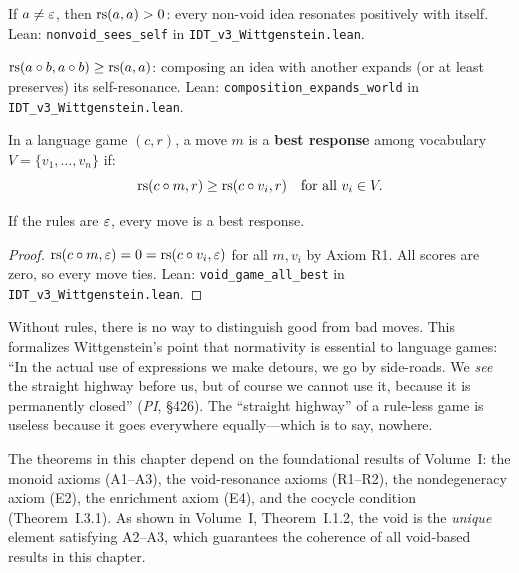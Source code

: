 \begin{theorem}
\label{thm:nonvoid-sees-self}
If $a \neq \varepsilon$, then $\mathrm{rs}(a, a) > 0$: every non-void idea resonates
positively with itself.
Lean: \texttt{nonvoid\_sees\_self} in \texttt{IDT\_v3\_Wittgenstein.lean}.
\end{theorem}

\begin{theorem}
\label{thm:composition-expands}
$\mathrm{rs}(a \circ b, a \circ b) \geq \mathrm{rs}(a, a)$: composing an idea with
another expands (or at least preserves) its self-resonance.
Lean: \texttt{composition\_expands\_world} in \texttt{IDT\_v3\_Wittgenstein.lean}.
\end{theorem}

\begin{definition}
In a language game $(c, r)$, a move $m$ is a \textbf{best response} among
vocabulary $V = \{v_1, \ldots, v_n\}$ if:
\[
\mathrm{rs}(c \circ m, r) \geq \mathrm{rs}(c \circ v_i, r) \quad \text{for all } v_i \in V.
\]
\end{definition}

\begin{theorem}
\label{thm:void-game-best}
If the rules are $\varepsilon$, every move is a best response.
\end{theorem}

\begin{proof}
$\mathrm{rs}(c \circ m, \varepsilon) = 0 = \mathrm{rs}(c \circ v_i, \varepsilon)$ for all $m, v_i$
by Axiom R1. All scores are zero, so every move ties.
Lean: \texttt{void\_game\_all\_best} in \texttt{IDT\_v3\_Wittgenstein.lean}.
\end{proof}

\begin{interpretation}
Without rules, there is no way to distinguish good from bad moves. This formalizes
Wittgenstein's point that normativity is essential to language games: ``In the
actual use of expressions we make detours, we go by side-roads. We \emph{see}
the straight highway before us, but of course we cannot use it, because it is
permanently closed'' (\textit{PI}, \S426). The ``straight highway'' of a
rule-less game is useless because it goes everywhere equally---which is to say,
nowhere.
\end{interpretation}

\begin{remark}
The theorems in this chapter depend on the foundational results of Volume~I:
the monoid axioms (A1--A3), the void-resonance axioms (R1--R2), the nondegeneracy
axiom (E2), the enrichment axiom (E4), and the cocycle condition (Theorem~I.3.1).
As shown in Volume~I, Theorem~I.1.2, the void is the \emph{unique} element
satisfying A2--A3, which guarantees the coherence of all void-based results in
this chapter.
\end{remark}


